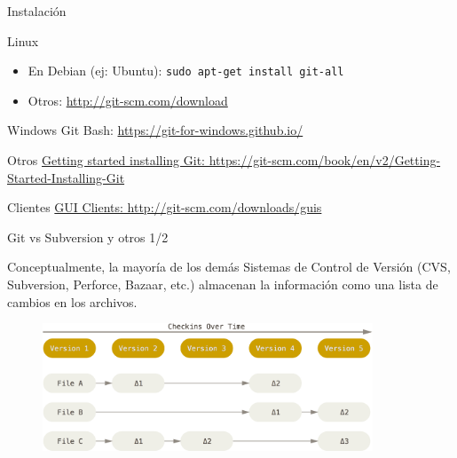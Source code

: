 \documentclass{beamer}
\begin{document}
\begin{frame}{Instalación}

    \begin{block}{Linux}
        \begin{itemize}
            \item En Debian (ej: Ubuntu): \texttt{sudo apt-get install git-all}
            \item Otros: \url{http://git-scm.com/download}
        \end{itemize}
    \end{block}

    \begin{block}{Windows}
        Git Bash: \url{https://git-for-windows.github.io/}
    \end{block}

    \begin{block}{Otros}
        \href{https://git-scm.com/book/en/v2/Getting-Started-Installing-Git}
        {Getting started installing Git: https://git-scm.com/book/en/v2/Getting-Started-Installing-Git}
    \end{block}

    \begin{block}{Clientes}
        \href{http://git-scm.com/downloads/guis}
        {GUI Clients: http://git-scm.com/downloads/guis}
    \end{block}

\end{frame}

\begin{frame}{Git vs Subversion y otros 1/2}

    Conceptualmente, la mayoría de los demás Sistemas de Control de Versión
    (CVS, Subversion, Perforce, Bazaar, etc.) almacenan la información
    como una lista de cambios en los archivos.

    \vspace{0.5em}

    \begin{figure}[ht]
        \begin{center}
            \includegraphics[height=1.5in]{images/svn-data.png}
        \end{center}
    \end{figure}

\end{frame}
\end{document}
